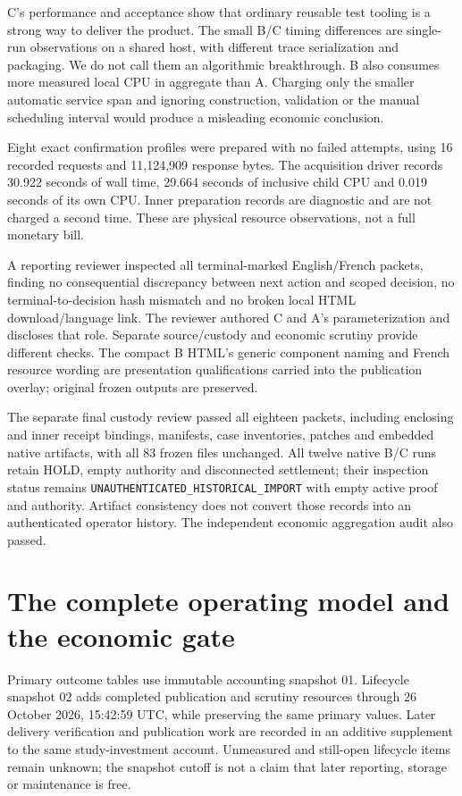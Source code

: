 \documentclass[11pt,a4paper]{article}
\begin{document}
C's performance and acceptance show that ordinary reusable test tooling is a strong way to deliver the product. The small B/C timing differences are single-run observations on a shared host, with different trace serialization and packaging. We do not call them an algorithmic breakthrough. B also consumes more measured local CPU in aggregate than A. Charging only the smaller automatic service span and ignoring construction, validation or the manual scheduling interval would produce a misleading economic conclusion.

Eight exact confirmation profiles were prepared with no failed attempts, using 16 recorded requests and 11,124,909 response bytes. The acquisition driver records 30.922 seconds of wall time, 29.664 seconds of inclusive child CPU and 0.019 seconds of its own CPU. Inner preparation records are diagnostic and are not charged a second time. These are physical resource observations, not a full monetary bill.\cite{economics}

A reporting reviewer inspected all terminal-marked English/French packets, finding no consequential discrepancy between next action and scoped decision, no terminal-to-decision hash mismatch and no broken local HTML download/language link. The reviewer authored C and A's parameterization and discloses that role. Separate source/custody and economic scrutiny provide different checks. The compact B HTML's generic component naming and French resource wording are presentation qualifications carried into the publication overlay; original frozen outputs are preserved.\cite{productreview}

The separate final custody review passed all eighteen packets, including enclosing and inner receipt bindings, manifests, case inventories, patches and embedded native artifacts, with all 83 frozen files unchanged. All twelve native B/C runs retain HOLD, empty authority and disconnected settlement; their inspection status remains \texttt{UNAUTHENTICATED\_HISTORICAL\_IMPORT} with empty active proof and authority. Artifact consistency does not convert those records into an authenticated operator history. The independent economic aggregation audit also passed.\cite{custody,economicaudit}

\section{The complete operating model and the economic gate}
\label{sec:economics}

Primary outcome tables use immutable accounting snapshot 01. Lifecycle snapshot 02 adds completed publication and scrutiny resources through 26 October 2026, 15:42:59 UTC, while preserving the same primary values. Later delivery verification and publication work are recorded in an additive supplement to the same study-investment account. Unmeasured and still-open lifecycle items remain unknown; the snapshot cutoff is not a claim that later reporting, storage or maintenance is free.\cite{economicupdate}
\end{document}
